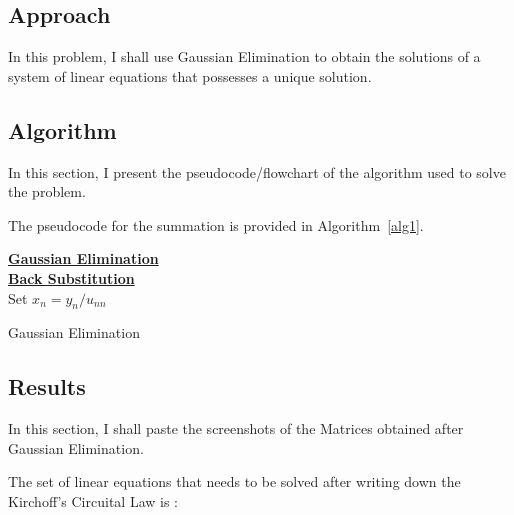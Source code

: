 \documentclass[titlepage, 11pt]{article}
\begin{document}
\subsection{Approach}
 In this problem, I shall use Gaussian Elimination to obtain the solutions of a system of linear equations that possesses a unique solution. 

\subsection{Algorithm}
In this section, I present the pseudocode/flowchart of the algorithm used to solve the problem.

The pseudocode for the summation is provided in Algorithm~\ref{alg1}.
\begin{center}
\begin{algorithm}[H]\label{alg1}

\SetAlgoLined
{
\underline{\textbf{Gaussian Elimination} }\\{
}
\underline{\textbf{Back Substitution}} \\{
    Set $x_n = {y_n}/{u_{nn}}$ \\
}
}
 \caption{Gaussian Elimination}
\end{algorithm}    
\end{center}

\subsection{Results}

In this section, I shall paste the screenshots of the Matrices obtained after Gaussian Elimination. 

The set of linear equations that needs to be solved after writing down the Kirchoff's Circuital Law is :
\end{document}
